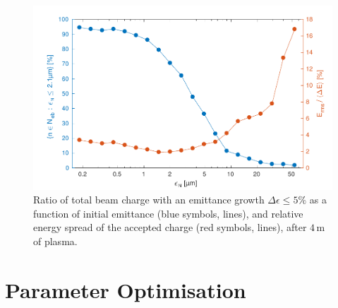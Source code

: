 \documentclass[aps,prstab,reprint,amsmath,amssymb,groupedaddress,onecolumn]{revtex4-1}
\newcommand{\unit}[1]{\,\mathrm{#1}}
\begin{document}
\begin{figure}[hbt]
    \includegraphics[width=\linewidth,trim={2mm 0mm 2mm 0mm},clip]{figures/beamQualityEmittance}
    \caption{\label{Fig:BeamQEmit} Ratio of total beam charge with an emittance growth $\Delta\epsilon \leq 5\%$ as a
        function of initial emittance (blue %
        symbols, lines), and relative energy spread of the accepted charge (red %
        symbols, lines), after $4\unit{m}$
        of plasma.}
\end{figure}

\section{Parameter Optimisation}\label{S:PO}
\end{document}
